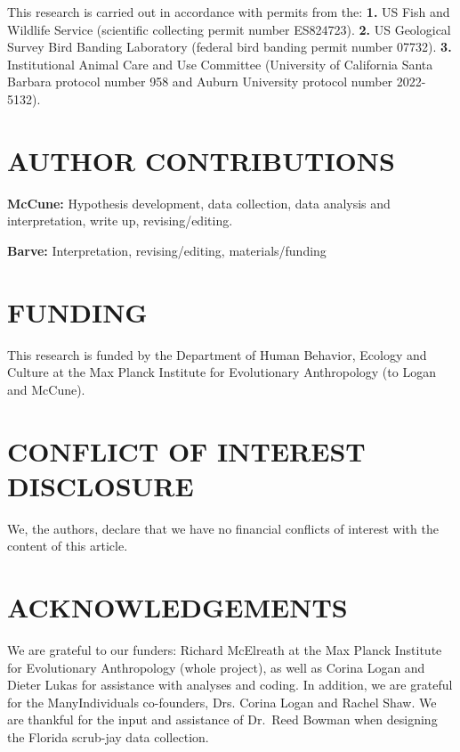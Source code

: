 \documentclass[
]{article}
\begin{document}
This research is carried out in accordance with permits from the:
\textbf{1.} US Fish and Wildlife Service (scientific collecting permit
number ES824723). \textbf{2.} US Geological Survey Bird Banding
Laboratory (federal bird banding permit number 07732). \textbf{3.}
Institutional Animal Care and Use Committee (University of California
Santa Barbara protocol number 958 and Auburn University protocol number
2022-5132).

\section{\texorpdfstring{\textbf{AUTHOR
CONTRIBUTIONS}}{AUTHOR CONTRIBUTIONS}}\label{author-contributions}

\textbf{McCune:} Hypothesis development, data collection, data analysis
and interpretation, write up, revising/editing.

\textbf{Barve:} Interpretation, revising/editing, materials/funding

\section{\texorpdfstring{\textbf{FUNDING}}{FUNDING}}\label{funding}

This research is funded by the Department of Human Behavior, Ecology and
Culture at the Max Planck Institute for Evolutionary Anthropology (to
Logan and McCune).

\section{\texorpdfstring{\textbf{CONFLICT OF INTEREST
DISCLOSURE}}{CONFLICT OF INTEREST DISCLOSURE}}\label{conflict-of-interest-disclosure}

We, the authors, declare that we have no financial conflicts of interest
with the content of this article.

\section{\texorpdfstring{\textbf{ACKNOWLEDGEMENTS}}{ACKNOWLEDGEMENTS}}\label{acknowledgements}

We are grateful to our funders: Richard McElreath at the Max Planck
Institute for Evolutionary Anthropology (whole project), as well as
Corina Logan and Dieter Lukas for assistance with analyses and coding.
In addition, we are grateful for the ManyIndividuals co-founders, Drs.
Corina Logan and Rachel Shaw. We are thankful for the input and
assistance of Dr.~Reed Bowman when designing the Florida scrub-jay data
collection.
\end{document}
